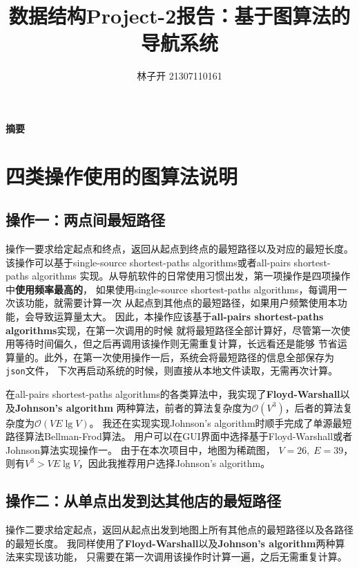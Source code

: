 \documentclass{article}
\title{数据结构Project-2报告：基于图算法的导航系统}
\author{林子开 21307110161}
\begin{document}
	\maketitle
\paragraph*{摘要} 

	\tableofcontents

\section{四类操作使用的图算法说明}
\subsection{操作一：两点间最短路径}
操作一要求给定起点和终点，返回从起点到终点的最短路径以及对应的最短长度。
该操作可以基于single-source shortest-paths algorithms或者all-pairs shortest-paths algorithms
实现。从导航软件的日常使用习惯出发，第一项操作是四项操作中\textbf{使用频率最高的}，
如果使用single-source shortest-paths algorithms，每调用一次该功能，就需要计算一次
从起点到其他点的最短路径，如果用户频繁使用本功能，会导致运算量太大。
因此，本操作应该基于\textbf{all-pairs shortest-paths algorithms}实现，在第一次调用的时候
就将最短路径全部计算好，尽管第一次使用等待时间偏久，但之后再调用该操作则无需重复计算，长远看还是能够
节省运算量的。此外，在第一次使用操作一后，系统会将最短路径的信息全部保存为\texttt{json}文件，
下次再启动系统的时候，则直接从本地文件读取，无需再次计算。

在all-pairs shortest-paths algorithms的各类算法中，我实现了\textbf{Floyd-Warshall}以及\textbf{Johnson's algorithm}
两种算法，前者的算法复杂度为$\mathcal{O}(V^3)$，后者的算法复杂度为$\mathcal{O}(V E\lg V)$。
我还在实现实现Johnson's algorithm时顺手完成了单源最短路径算法Bellman-Frod算法。
用户可以在GUI界面中选择基于Floyd-Warshall或者Johnson算法实现操作一。
由于在本次项目中，地图为稀疏图，
$V=26,\;E=39$，则有$V^3 > VE\lg V$，因此我推荐用户选择Johnson's algorithm。


\subsection{操作二：从单点出发到达其他店的最短路径}
操作二要求给定起点，返回从起点出发到地图上所有其他点的最短路径以及各路径的最短长度。
我同样使用了\textbf{Floyd-Warshall}以及\textbf{Johnson's algorithm}两种算法来实现该功能，
只需要在第一次调用该操作时计算一遍，之后无需重复计算。
\end{document}
